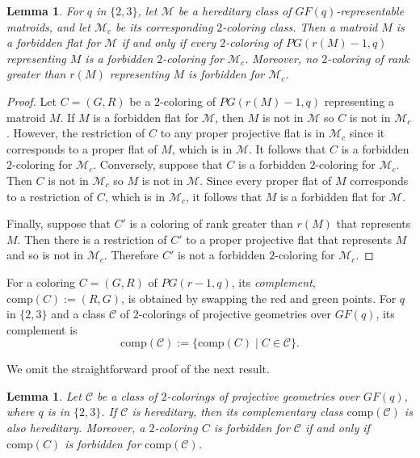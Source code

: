 \documentclass[11pt]{amsart}
\newtheorem{lemma}[theorem]{Lemma}
\theoremstyle{definition}
\theoremstyle{remark}
\numberwithin{equation}{section}
\begin{document}
\begin{lemma}
\label{forbidden_colorings_flats}
For $q$ in $\{2, 3\}$, let $\mathcal{M}$ be a hereditary class of $GF(q)$-representable matroids, and let $\mathcal{M}_c$ be its corresponding $2$-coloring class. Then a matroid $M$ is a forbidden flat for $\mathcal{M}$ if and only if every $2$-coloring of $PG(r(M)-1,q)$ representing $M$ is a forbidden $2$-coloring for $\mathcal{M}_c$. Moreover, no $2$-coloring of rank greater than $r(M)$ representing $M$ is forbidden for $\mathcal{M}_c$. 
\end{lemma}

\begin{proof}
Let $C = (G,R)$ be a $2$-coloring of $PG(r(M)-1,q)$ representing a matroid $M$. If $M$ is a forbidden flat for $\mathcal{M}$, then $M$ is not in $\mathcal{M}$ so $C$ is not in $\mathcal{M}_c$. However, the restriction of $C$ to any proper projective flat is in $\mathcal{M}_c$ since it corresponds to a proper flat of $M$, which is in $\mathcal{M}$. It follows that $C$ is a forbidden $2$-coloring for $\mathcal{M}_c$. Conversely, suppose that $C$ is a forbidden $2$-coloring for $\mathcal{M}_c$. Then $C$ is not in $\mathcal{M}_c$ so $M$ is not in $\mathcal{M}$. Since every proper flat of $M$ corresponds to a restriction of $C$, which is in $\mathcal{M}_c$, it follows that $M$ is a forbidden flat for $\mathcal{M}$.

Finally, suppose that $C'$ is a coloring of rank greater than $r(M)$ that represents $M$. Then there is a restriction of $C'$ to a proper projective flat that represents $M$ and so is not in $\mathcal{M}_c$. Therefore $C'$ is not a forbidden $2$-coloring for $\mathcal{M}_c$. 
\end{proof}


For a coloring $C=(G,R)$ of $PG(r-1,q)$, its \textit{complement}, $\mathrm{comp}(C) := (R,G)$, is obtained by swapping the red and green points. For $q$ in $\{2, 3\}$ and a class $\mathcal{C}$ of $2$-colorings of projective geometries over $GF(q)$, its complement is
\[
\mathrm{comp}(\mathcal{C}) := \{\mathrm{comp}(C) \mid C \in \mathcal{C}\}.
\]


We omit the straightforward proof of the next result.


\begin{lemma}
\label{complement_class}
Let $\mathcal{C}$ be a class of $2$-colorings of projective geometries over $GF(q)$, where $q$ is in  $\{2, 3\}$. 
If $\mathcal{C}$ is hereditary, then its complementary class $\mathrm{comp}(\mathcal{C})$ is also hereditary. Moreover, a $2$-coloring $C$ is forbidden for $\mathcal{C}$ if and only if $\mathrm{comp}(C)$ is forbidden for $\mathrm{comp}(\mathcal{C})$.
\end{lemma}
\end{document}
